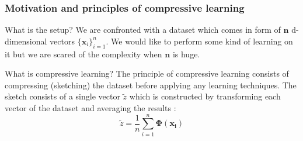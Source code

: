 
	
	\begin{frame}
		\frametitle{Motivation and principles of compressive learning}
		
		\begin{block}{What is the setup?}
			We are confronted with a dataset which comes in form of $\boldsymbol{n}$ d-dimensional vectors {$\{\boldsymbol{x}_{i}\}_{i = 1}^{n}$}. We would like to perform some kind of learning on it but we are scared of the complexity when $\boldsymbol{n}$ is huge.
			
		\end{block}
		
		\begin{block}{What is compressive learning?}
			The principle of compressive learning consists of compressing (sketching) the dataset before applying any learning techniques. The sketch consists of a single vector $\tilde{z}$ which is constructed by transforming each vector of the dataset and averaging the results :
			$$
			\tilde{z} = \frac{1}{n}\sum_{i = 1}^{n} \boldsymbol{\Phi(x_{i})}
			$$
		\end{block}
	\end{frame}
	
